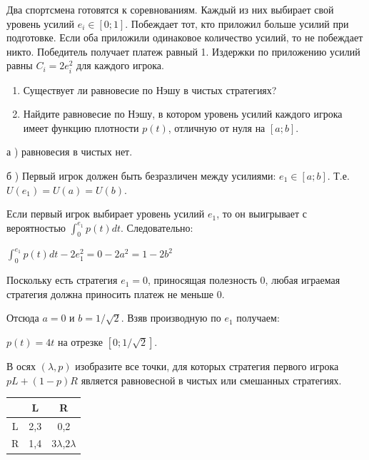 \begin{problem}

Два спортсмена готовятся к соревнованиям. Каждый из них выбирает
свой уровень усилий $e_{i}\in[0;1]$. Побеждает тот, кто приложил
больше усилий при подготовке. Если оба приложили одинаковое
количество усилий, то не побеждает никто. Победитель получает
платеж равный 1. Издержки по приложению усилий равны
$C_{i}=2e_{i}^{2}$ для каждого игрока. \par
\begin{enumerate}
\item Существует ли равновесие по Нэшу в чистых стратегиях? \par
\item Найдите равновесие по Нэшу, в котором уровень усилий каждого
игрока имеет функцию плотности $p(t)$, отличную от нуля на $[a;b]$.
\end{enumerate}


\begin{sol}

а ) равновесия в чистых нет. \par
б ) Первый игрок должен быть безразличен между усилиями:
$e_{1}\in [a;b]$. Т.е. $U(e_{1})=U(a)=U(b)$. \par
Если первый игрок выбирает уровень усилий $e_{1}$, то он
выигрывает с вероятностью $\int_{0}^{e_{1}}p(t)dt$.
Следовательно: \par
$\int_{0}^{e_{1}}p(t)dt-2e_{1}^{2}=0-2a^{2}=1-2b^{2}$ \par
Поскольку есть стратегия $e_{1}=0$, приносящая полезность 0, любая
играемая стратегия должна приносить платеж не меньше 0. \par
Отсюда $a=0$ и $b=1/\sqrt{2}$.
Взяв производную по $e_{1}$ получаем: \par
$p(t)=4t$ на отрезке $[0;1/\sqrt{2}]$.
\end{sol}
\end{problem}



\begin{problem}
 В осях $(\lambda,p)$ изобразите все точки, для которых стратегия
первого игрока $pL+(1-p)R$ является равновесной в чистых или
смешанных стратегиях.

\begin{tabular}{|c|c|c|}
  \hline
   & L & R \\
  \hline
  L & 2,3 & 0,2 \\
  R & 1,4 & $3\lambda$,$2\lambda$ \\
  \hline
\end{tabular}



\begin{sol}

\end{sol}
\end{problem}




